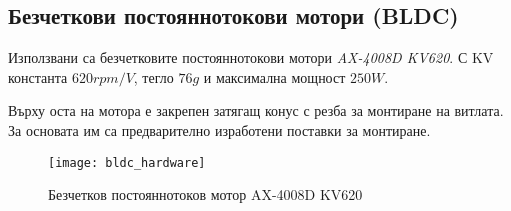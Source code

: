 \subsection{Безчеткови постояннотокови мотори (BLDC)}

Използвани са безчетковите постояннотокови мотори \textit{AX-4008D KV620}.
С KV константа \(620 rpm/V\), тегло \(76g\) и максимална мощност \(250W\).

Върху оста на мотора е закрепен затягащ конус с резба за монтиране на витлата.
За основата им са предварително изработени поставки за монтиране.

\begin{figure}[htpb!]
    \centering
    \texttt{[image: bldc\_hardware]}
    \caption{Безчетков постояннотоков мотор AX-4008D KV620}
    \label{fig:bldc_hardware}
\end{figure}

\FloatBarrier
